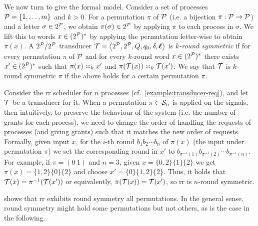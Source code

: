We now turn to give the formal model.
Consider a set of processes $\cP=\{1,\dots,m\}$ and $k>0$. For a permutation $\pi$ of $\cP$ (i.e. a bijection $\pi:\cP\to \cP$) and a letter $\sigma\in 2^{\cP}$, we obtain $\pi(\sigma)\in 2^{\cP}$ by applying $\pi$ to each process in $\sigma$. We lift this to words $x\in (2^{\cP})^*$ by applying the permutation letter-wise to obtain $\pi(x)$.
A $2^\cP/2^\cP$ transducer $\cT=\tup{2^\cP,2^\cP,Q,q_0,\delta,\lab}$ is \emph{$k$-round symmetric} if for every permutation $\pi$ of $\cP$ and for every $k$-round word $x\in (2^{\cP})^*$ there exists $x' \in (2^{\cP})^*$ such that $\pi(x)\req[k] x'$ and $\pi(\cT(x))\req[k] \cT(x')$.
We say that $\cT$ is $k$-round symmetric \WRT $\pi$ if the above holds for a certain permutation $\pi$.

\begin{example}
\label{example:rr_rsym}
Consider the \gls{rr} scheduler for $n$ processes (cf.~\cref{example:transducer-req}), and let $\cT$ be a transducer for it. When a permutation $\pi\in\cS_n$ is applied on the signals, then intuitively, to preserve the behaviour of the system (i.e. the number of grants for each process), we need to change the order of handling the requests of processes (and giving grants) such that it matches the new order of requests. Formally, given input $x$, for the $i$-th round $b_1 b_2\cdots b_n$ of $\pi(x)$ (the input under permutation $\pi$) we set the corresponding round in $x'$ to $b_{\pi^{-1}(1)} b_{\pi^{-1}(2)} \cdots b_{\pi^{-1}(n)}$.
For example, if $\pi=(0\ 1)$ and $n=3$, given $x=\{0,2\}\{1\}\{2\}$ we get $\pi(x)=\{1,2\}\{0\}\{2\}$ and choose $x'=\{0\}\{1,2\}\{2\}$.
Thus, it holds that $\cT(x)=\pi^{-1}(\cT(x'))$ or equivalently, $\pi(\cT(x))=\cT(x')$, so \gls{rr} is $n$-round symmetric.
\end{example}

 shows that \gls{rr} exhibits round symmetry \WRT all permutations. In the general sense, round symmetry might hold \WRT some permutations but not others, as is the case in the following.

